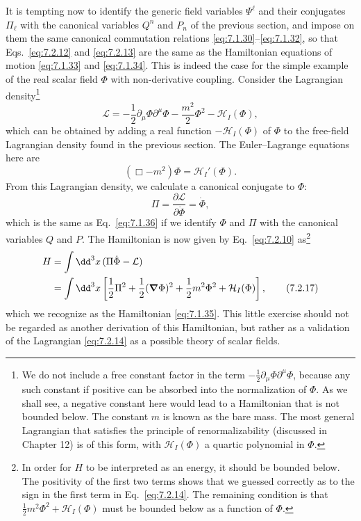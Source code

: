 It is tempting now to identify the generic field variables $\Psi^\ell$ and their
conjugates $\Pi_\ell$ with the canonical variables $Q^n$ and $P_n$ of the previous
section, and impose on them the same canonical commutation relations
\eqref{eq:7.1.30}--\eqref{eq:7.1.32}, so that Eqs.~\eqref{eq:7.2.12} and \eqref{eq:7.2.13} are the same as the
Hamiltonian equations of motion \eqref{eq:7.1.33} and \eqref{eq:7.1.34}. This is indeed the
case for the simple example of the real scalar field $\Phi$ with non-derivative
coupling. Consider the Lagrangian density\footnote{We do not include a free
constant factor in the term $-\tfrac12\partial_\mu\Phi\partial^\mu\Phi$, because
any such constant if positive can be absorbed into the normalization of $\Phi$.
As we shall see, a negative constant here would lead to a Hamiltonian that is
not bounded below. The constant $m$ is known as the bare mass. The most
general Lagrangian that satisfies the principle of renormalizability (discussed
in Chapter 12) is of this form, with $\mathcal{H}_I(\Phi)$ a quartic polynomial
in $\Phi$.}
\begin{equation}
\mathcal{L}=-\frac12\partial_\mu\Phi\partial^\mu\Phi
-\frac{m^2}{2}\Phi^2-\mathcal{H}_I(\Phi),
\tag{7.2.14}\label{eq:7.2.14}
\end{equation}
which can be obtained by adding a real function $-\mathcal{H}_I(\Phi)$ of $\Phi$
to the free-field Lagrangian density found in the previous section. The
Euler--Lagrange equations here are
\begin{equation}
(\Box-m^2)\Phi=\mathcal{H}_I'(\Phi).
\tag{7.2.15}\label{eq:7.2.15}
\end{equation}
From this Lagrangian density, we calculate a canonical conjugate to $\Phi$:
\begin{equation}
\Pi=\frac{\partial\mathcal{L}}{\partial\dot\Phi}=\dot\Phi,
\tag{7.2.16}\label{eq:7.2.16}
\end{equation}
which is the same as Eq.~\eqref{eq:7.1.36} if we identify $\Phi$ and $\Pi$ with the canonical
variables $Q$ and $P$. The Hamiltonian is now given by Eq.~\eqref{eq:7.2.10} as\footnote{In
order for $H$ to be interpreted as an energy, it should be bounded below. The
positivity of the first two terms shows that we guessed correctly as to the sign
in the first term in Eq.~\eqref{eq:7.2.14}. The remaining condition is that
$\tfrac12m^2\Phi^2+\mathcal{H}_I(\Phi)$ must be bounded below as a function of
$\Phi$.}
\begin{align}
H&=\int \dd^3x\,(\Pi\dot\Phi-\mathcal{L})
\notag\\
&=\int \dd^3x\left[\frac12\Pi^2+\frac12(\boldsymbol{\nabla}\Phi)^2
+\frac12m^2\Phi^2+\mathcal{H}_I(\Phi)\right],
\tag{7.2.17}\label{eq:7.2.17}
\end{align}
which we recognize as the Hamiltonian \eqref{eq:7.1.35}. This little exercise should
not be regarded as another derivation of this Hamiltonian, but rather as a
validation of the Lagrangian \eqref{eq:7.2.14} as a possible theory of scalar fields.

